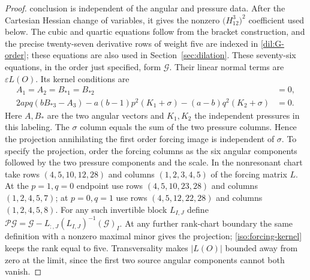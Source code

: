 \documentclass[11pt,a4paper]{article}
\numberwithin{equation}{section}
\theoremstyle{plain}
\theoremstyle{definition}
\theoremstyle{remark}
\begin{document}
\begin{proof}
conclusion is independent of the angular and pressure data.
After the Cartesian Hessian change of variables, it gives the nonzero
$\bigl(H_{12}^3\bigr)^2$ coefficient used below.
The cubic and quartic equations follow from the bracket construction,
and the precise twenty-seven derivative rows of weight five are indexed
in \eqref{dil:G-order}; these equations are also used in Section~\ref{sec:dilation}. These seventy-six equations, in the order just specified, form
$\boldsymbol{\mathcal G}$. Their linear normal terms are $\varepsilon L(O)$.
Its kernel conditions are
\begin{align}
 A_1=A_2=B_{*1}=B_{*2}&=0,\label{iso:forcing-kernel}\\
 2apq(bB_{*3}-A_3)-a(b-1)p^2(K_1+\sigma)
                         -(a-b)q^2(K_2+\sigma)&=0.
\end{align}
Here $A,B_*$ are the two angular vectors and $K_1,K_2$ the
independent pressures in this labeling.  The $\sigma$ column equals the
sum of the two pressure columns.  Hence the projection annihilating the
first order forcing image is independent of $\sigma$.
To specify the projection, order the forcing columns as the six angular
components followed by the two pressure components and the scale.
In the nonresonant chart take rows $(4,5,10,12,28)$ and columns
$(1,2,3,4,5)$ of the forcing matrix $L$.
At the $p=1,q=0$ endpoint use rows $(4,5,10,23,28)$ and columns
$(1,2,4,5,7)$; at $p=0,q=1$ use rows $(4,5,12,22,28)$ and columns
$(1,2,4,5,8)$.
For any such invertible block $L_{I,J}$ define
$\mathcal P\boldsymbol{\mathcal G}=\boldsymbol{\mathcal G}-L_{:,J}(L_{I,J})^{-1}(\boldsymbol{\mathcal G})_I$.
At any further rank-chart boundary the same definition with a nonzero
maximal minor gives the projection; \eqref{iso:forcing-kernel} keeps the
rank equal to five.
Transversality makes $|L(O)|$ bounded away from zero at the limit, since
the first two source angular components cannot both vanish.


\end{proof}
\end{document}
